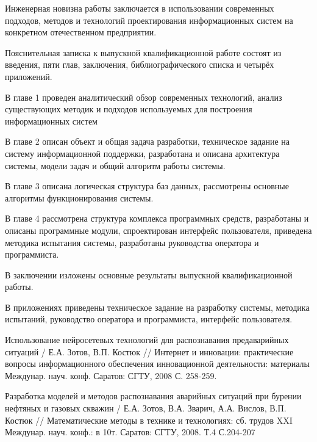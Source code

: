 \documentclass[a4paper,13pt]{article}
\begin{document}
Инженерная новизна работы заключается в использовании современных подходов, методов и технологий проектирования информационных систем на конкретном отечественном предприятии.

Пояснительная записка к выпускной квалификационной работе состоят из введения, пяти глав, заключения, библиографического списка и четырёх приложений.

В главе 1 проведен аналитический обзор современных технологий, анализ существующих методик и подходов используемых для построения информационных систем

В главе 2 описан объект и общая задача разработки, техническое задание на систему информационной поддержки, разработана и описана архитектура системы, модели задач и общий алгоритм работы системы.

В главе 3 описана  логическая структура баз данных, рассмотрены основные алгоритмы функционирования системы.

В главе 4 рассмотрена структура комплекса программных средств, разработаны и описаны программные модули, спроектирован интерфейс пользователя,  приведена методика испытания системы, разработаны руководства оператора и программиста.

В заключении изложены основные результаты выпускной квалификационной работы.

В приложениях приведены техническое задание на разработку системы, методика испытаний, руководство оператора и программиста, интерфейс пользователя.
\newpage
\begin{thebibliography}{2}
Использование нейросетевых технологий для распознавания предаварийных ситуаций / Е.А. Зотов, В.П. Костюк // Интернет и инновации: практические вопросы информационного обеспечения инновационной деятельности: материалы Междунар. науч. конф. Саратов: СГТУ, 2008 С. 258-259.

 Разработка моделей и методов распознавания аварийных ситуаций при бурении нефтяных и газовых скважин / Е.А. Зотов, В.А. Зварич, А.А. Вислов, В.П. Костюк // Математические методы в технике и технологиях: сб. трудов XXI Междунар. науч. конф.: в 10т. Саратов: СГТУ, 2008. Т.4 С.204-207
\end{thebibliography}
\end{document}
